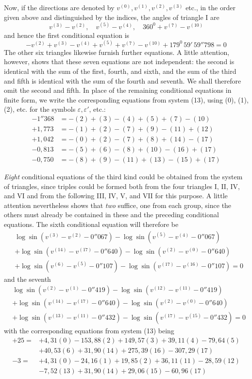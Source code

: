 Now, if the directions are denoted by \(v^{(0)},v^{(1)},v^{(2)},v^{(3)}\) etc., in the order given above and distinguished by the indices, the angles of triangle I are
\[
v^{(3)}-v^{(2)},\quad v^{(5)}-v^{(4)},\quad 360^0+v^{(7)}-v^{(10)}
\]
and hence the first conditional equation is
\[
-v^{(2)}+v^{(3)}-v^{(4)}+v^{(5)}+v^{(7)}-v^{(10)}+179^0\,59'\,59''798=0
\]
The other six triangles likewise furnish further equations. A little attention, however, shows that these seven equations are not independent: the second is identical with the sum of the first, fourth, and sixth, and the sum of the third and fifth is identical with the sum of the fourth and seventh. We shall therefore omit the second and fifth. In place of the remaining conditional equations in finite form, we write the corresponding equations from system (13), using (0), (1), (2), etc. for the symbols \(\varepsilon,\varepsilon'\), etc.:
\[
\begin{aligned}
-1''368&=-(2)+(3)-(4)+(5)+(7)-(10)\\
+1{,}773&=-(1)+(2)-(7)+(9)-(11)+(12)\\
+1{,}042&=-(0)+(2)-(7)+(8)+(14)-(17)\\
-0{,}813&=-(5)+(6)-(8)+(10)-(16)+(17)\\
-0{,}750&=-(8)+(9)-(11)+(13)-(15)+(17)
\end{aligned}
\]

\textit{Eight} conditional equations of the third kind could be obtained from the system of triangles, since triples could be formed both from the four triangles I, II, IV, and VI and from the following
III, IV, V, and VII for this purpose. A little attention nevertheless shows that \textit{two} suffice, one from each group, since the others must already be contained in these and the preceding conditional equations. The sixth conditional equation will therefore be
\[
\begin{aligned}
&\log\sin(v^{(3)}-v^{(2)}-0''067)-\log\sin(v^{(5)}-v^{(4)}-0''067)\\
&+\log\sin(v^{(14)}-v^{(17)}-0''640)-\log\sin(v^{(2)}-v^{(0)}-0''640)\\
&+\log\sin(v^{(6)}-v^{(5)}-0''107)-\log\sin(v^{(17)}-v^{(16)}-0''107)=0
\end{aligned}
\]
and the seventh
\[
\begin{aligned}
&\log\sin(v^{(2)}-v^{(1)}-0''419)-\log\sin(v^{(12)}-v^{(11)}-0''419)\\
&+\log\sin(v^{(14)}-v^{(17)}-0''640)-\log\sin(v^{(2)}-v^{(0)}-0''640)\\
&+\log\sin(v^{(13)}-v^{(11)}-0''432)-\log\sin(v^{(17)}-v^{(15)}-0''432)=0
\end{aligned}
\]
with the corresponding equations from system (13) being
\[
\begin{aligned}
+25={}&+4{,}31(0)-153{,}88(2)+149{,}57(3)+39{,}11(4)-79{,}64(5)\\
&+40{,}53(6)+31{,}90(14)+275{,}39(16)-307{,}29(17)\\
-3={}&+4{,}31(0)-24{,}16(1)+19{,}85(2)+36{,}11(11)-28{,}59(12)\\
&-7{,}52(13)+31{,}90(14)+29{,}06(15)-60{,}96(17)
\end{aligned}
\]

